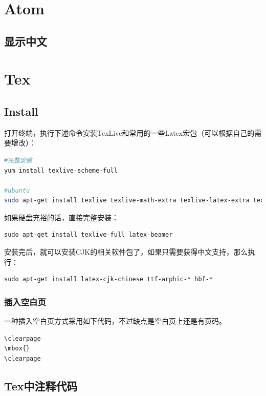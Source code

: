 \documentclass{book}
\begin{document}
\section{Atom}

\subsection{显示中文}

\section{Tex}

\subsection{Install}

打开终端，执行下述命令安装TexLive和常用的一些Latex宏包（可以根据自己的需要增改）：

\begin{lstlisting}[language=Bash]
#完整安装
yum install texlive-scheme-full

#ubuntu
sudo apt-get install texlive texlive-math-extra texlive-latex-extra texlive-latex-recommended texlive-pictures texlive-science texlive-bibtex-extra latex-beamer
\end{lstlisting}

如果硬盘充裕的话，直接完整安装：

\begin{lstlisting}
sudo apt-get install texlive-full latex-beamer
\end{lstlisting}

安装完后，就可以安装CJK的相关软件包了，如果只需要获得中文支持，那么执行：

\begin{lstlisting}
sudo apt-get install latex-cjk-chinese ttf-arphic-* hbf-*
\end{lstlisting}

\subsubsection{插入空白页}

一种插入空白页方式采用如下代码，不过缺点是空白页上还是有页码。

\begin{lstlisting}
\clearpage
\mbox{}         
\clearpage
\end{lstlisting}

\subsection{Tex中注释代码}
\end{document}
